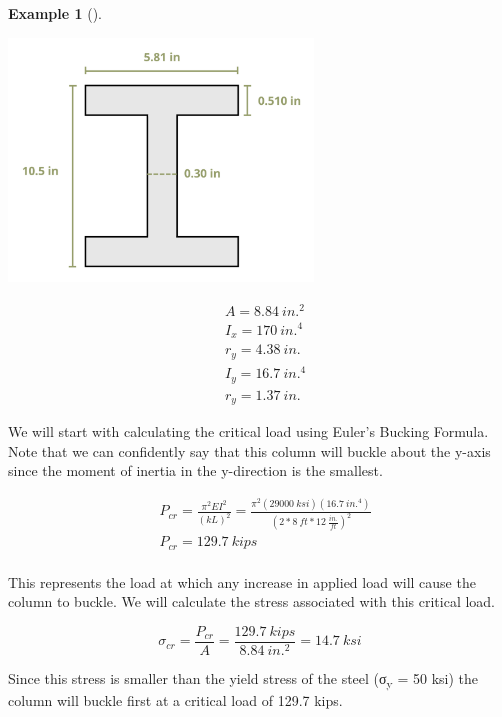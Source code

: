 \documentclass[
  letterpaper,
  DIV=11,
  numbers=noendperiod]{scrreprt}
\theoremstyle{definition}
\newtheorem{example}{Example}[chapter]
\theoremstyle{remark}
\begin{document}
\begin{tcolorbox}
\begin{example}[]
\begin{tcolorbox}
\begin{center}
\includegraphics[width=3.1875in,height=\textheight]{images/CH15s PNGs/example 15.2 part 2.png}
\end{center}

\[
\begin{aligned}
& A=8.84{~in.}^2 \\
& I_x=170{~in.}^4 \\
& r_y=4.38{~in.} \\
& I_y=16.7{~in.}^4 \\
& r_y=1.37{~in.}
\end{aligned}
\]

We will start with calculating the critical load using Euler's Bucking
Formula. Note that we can confidently say that this column will buckle
about the y-axis since the moment of inertia in the y-direction is the
smallest.

\[
\begin{aligned}
& P_{cr}=\frac{\pi^2 E I^2}{(k L)^2}=\frac{\pi^2(29000{~ksi})(16.7{~in.^4})}{\left(2*8{~ft}*12~\frac{in.}{ft}\right)^2} \\
& P_{c r}=129.7{~kips} \\
&
\end{aligned}
\]

This represents the load at which any increase in applied load will
cause the column to buckle. We will calculate the stress associated with
this critical load.

\[
\sigma_{c r}=\frac{P_{cr}}{A}=\frac{129.7{~kips}}{8.84{~in.^2}}=14.7{~ksi}
\]

Since this stress is smaller than the yield stress of the steel
(σ\textsubscript{y} = 50 ksi) the column will buckle first at a critical
load of 129.7 kips.

\end{tcolorbox}

\end{example}

\end{tcolorbox}
\end{document}

